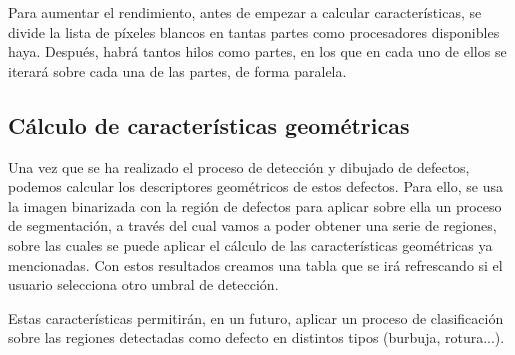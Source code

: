 Para aumentar el rendimiento, antes de empezar a calcular características, se divide la lista de píxeles blancos en tantas partes como procesadores disponibles haya. Después, habrá tantos hilos como partes, en los que en cada uno de ellos se iterará sobre cada una de las partes, de forma paralela.

\subsection{Cálculo de características geométricas}
Una vez que se ha realizado el proceso de detección y dibujado de defectos, podemos calcular los descriptores geométricos de estos defectos. Para ello, se usa la imagen binarizada con la región de defectos para aplicar sobre ella un proceso de segmentación, a través del cual vamos a poder obtener una serie de regiones, sobre las cuales se puede aplicar el cálculo de las características geométricas ya mencionadas. Con estos resultados creamos una tabla que se irá refrescando si el usuario selecciona otro umbral de detección.

Estas características permitirán, en un futuro, aplicar un proceso de clasificación sobre las regiones detectadas como defecto en distintos tipos (burbuja, rotura...).